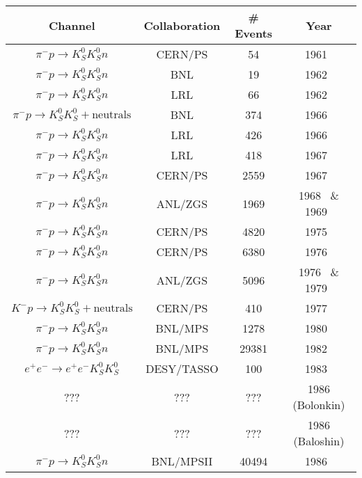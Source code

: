 \begin{table}
  \begin{center}
    \begin{tabular}{cccc}\toprule
      Channel & Collaboration & \# Events & Year\\\midrule
      $\pi^- p \to K_S^0 K_S^0 n$ & CERN/PS & 54 & 1961~\cite{cremieu-alcan_proceedings_1962}\\
      $\pi^- p \to K_S^0 K_S^0 n$ & BNL & 19 & 1962~\cite{erwin_experimental_1962}\\
      $\pi^- p \to K_S^0 K_S^0 n$ & LRL & 66 & 1962~\cite{alexander_final-state_1962}\\
      $\pi^- p \to K_S^0 K_S^0 + \text{neutrals}$ & BNL & 374 & 1966~\cite{crennell_observation_1966}\\
      $\pi^- p \to K_S^0 K_S^0 n$ & LRL & 426 & 1966~\cite{hess_low-mass_1966}\\
      $\pi^- p \to K_S^0 K_S^0 n$ & LRL & 418 & 1967~\cite{dahl_strange-particle_1967}\\
      $\pi^- p \to K_S^0 K_S^0 n$ & CERN/PS & 2559 & 1967~\cite{beusch_observation_1967}\\
      $\pi^- p \to K_S^0 K_S^0 n$ & ANL/ZGS & 1969 & 1968~\cite{hoang_k_1_0k_1_0_1968} \& 1969~\cite{hoang_investigation_1969}\\
      $\pi^- p \to K_S^0 K_S^0 n$ & CERN/PS & 4820 & 1975~\cite{beusch_new_1975}\\
      $\pi^- p \to K_S^0 K_S^0 n$ & CERN/PS & 6380 & 1976~\cite{wetzel_study_1976}\\
      $\pi^- p \to K_S^0 K_S^0 n$ & ANL/ZGS & 5096 & 1976~\cite{cason_observation_1976} \& 1979~\cite{polychronakos_study_1979}\\
      $K^- p \to K_S^0 K_S^0 + \text{neutrals}$ & CERN/PS & 410 & 1977~\cite{barreiro_production_1977}\\
      $\pi^- p \to K_S^0 K_S^0 n$ & BNL/MPS & 1278 & 1980~\cite{gottesman_peripheral_1980}\\
      $\pi^- p \to K_S^0 K_S^0 n$ & BNL/MPS & 29381 & 1982~\cite{etkin_amplitude_1982}\\
      $e^+e^- \to e^+e^- K_S^0 K_S^0$ & DESY/TASSO & 100 & 1983~\cite{althoff_production_1983}\\
      ??? & ??? & ??? & 1986 (Bolonkin)\\
      ??? & ??? & ??? & 1986 (Baloshin)\\
      $\pi^- p \to K_S^0 K_S^0 n$ & BNL/MPSII & 40494 & 1986~\cite{longacre_measurement_1986}\\

\end{tabular}
\end{center}
\end{table}

